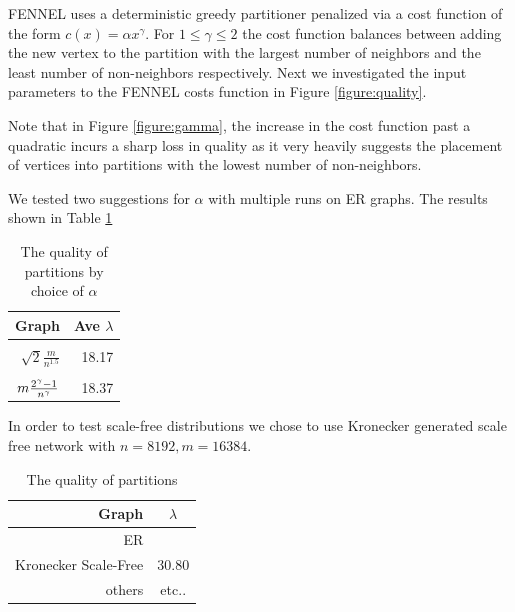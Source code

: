 \documentclass[11pt]{article}
\begin{document}
FENNEL uses a deterministic greedy partitioner penalized via a cost function of the form $c(x) = \alpha x^\gamma$.
For $1\le\gamma\le 2$ the cost function balances between adding the new vertex to the partition with the largest number of neighbors and the least number of non-neighbors respectively.
Next we investigated the input parameters to the FENNEL costs function in Figure \ref{figure:quality}.  

Note that in Figure \ref{figure:gamma}, the increase in the cost function past a quadratic incurs a sharp loss in quality as it very heavily suggests the placement of vertices into partitions with the lowest number of non-neighbors.

We tested two suggestions for $\alpha$ with multiple runs on ER graphs.
The results shown in Table \ref{table:qualityalpha}
\begin{table}[ht]
\centering
\caption{The quality of partitions by choice of $\alpha$}
\label{table:qualityalpha}
\begin{tabular}{r | r}\hline
Graph & Ave $\lambda$ \\ \hline &\\
$\sqrt{2}\frac{m}{n^1.5}$ & 18.17\\ &\\
$\vspace{3pt}m\frac{2^\gamma-1}{n^\gamma} $&18.37\\
\end{tabular}
\end{table}



In order to test scale-free distributions we chose to use Kronecker generated scale free network with $n=8192, m=16384$.

\begin{table}[h]
\centering
\caption{The quality of partitions}
\label{table:quality}
\begin{tabular}{r | c}\hline
Graph & $\lambda$ \\ \hline
ER & \\
Kronecker Scale-Free & 30.80\\
others & etc..\\
\end{tabular}
\end{table}



\end{document}
